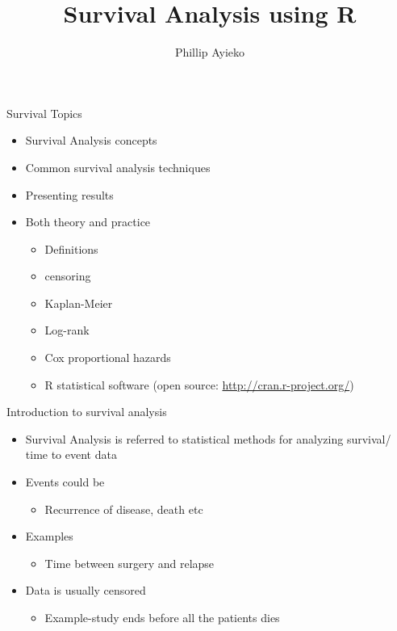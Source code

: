 \documentclass[ignorenonframetext,]{beamer}
\title{Survival Analysis using R}
\author{Phillip Ayieko}
\date{}
\begin{document}
\frame{\titlepage}

\begin{frame}{Survival Topics}

\begin{itemize}
\itemsep1pt\parskip0pt
\item
  Survival Analysis concepts
\item
  Common survival analysis techniques
\item
  Presenting results
\item
  Both theory and practice

  \begin{itemize}
  \itemsep1pt\parskip0pt
  \item
    Definitions
  \item
    censoring
  \item
    Kaplan-Meier
  \item
    Log-rank
  \item
    Cox proportional hazards
  \item
    R statistical software (open source:
    \url{http://cran.r-project.org/})
  \end{itemize}
\end{itemize}

\end{frame}

\begin{frame}{Introduction to survival analysis}

\begin{itemize}
\itemsep1pt\parskip0pt
\item
  Survival Analysis is referred to statistical methods for analyzing
  survival/ time to event data
\item
  Events could be

  \begin{itemize}
  \itemsep1pt\parskip0pt
  \item
    Recurrence of disease, death etc
  \end{itemize}
\item
  Examples

  \begin{itemize}
  \itemsep1pt\parskip0pt
  \item
    Time between surgery and relapse
  \end{itemize}
\item
  Data is usually censored

  \begin{itemize}
  \itemsep1pt\parskip0pt
  \item
    Example-study ends before all the patients dies
  \end{itemize}
\end{itemize}

\end{frame}
\end{document}
